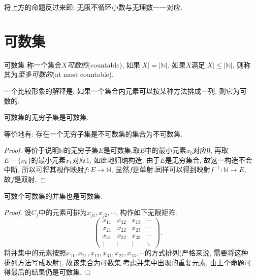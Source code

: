 将上方的命题反过来即: 无限不循环小数与无理数一一对应.

\newpage
\section{可数集}

\begin{definition}{可数集}
	称一个集合$X$\textit{可数的}(countable), 如果$|X| = |\mathbb{N}|$. 如果$X$满足$|X| \leq |\mathbb{N}|$, 则称其为\textit{至多可数的}(at most countable).
\end{definition}

一个比较形象的解释是, 如果一个集合内元素可以按某种方法排成一列, 则它为可数的.

\begin{proposition}{}
	可数集的无穷子集是可数集.
\end{proposition}
\begin{remark}
	等价地有: 存在一个无穷子集是不可数集的集合为不可数集.
\end{remark}
\begin{proof}
	等价于说明$\mathbb{N}$的无穷子集$E$是可数集.取$E$中的最小元素$x_0$对应$0$, 再取$E-\{ x_0 \}$的最小元素$x_1$对应$1$, 如此地归纳构造, 由于$E$是无穷集合, 故这一构造不会中断, 所以可将其视作映射$f: E \to \mathbb{N}$, 显然$f$是单射.同样可以得到映射$f^{-1}: \mathbb{N} \to E$, 故$f$是双射.
\end{proof}

\begin{proposition}{}
	可数个可数集的并集也是可数集.
\end{proposition}
\begin{proof}
	设$C_j$中的元素可排为$x_{j1}, x_{j2}, \cdots $, 构作如下无限矩阵: $$\begin{pmatrix}
 x_{11} & x_{12} & x_{13} & \cdots \\
 x_{21} & x_{22} & x_{23} & \cdots \\
 x_{31} & x_{32} & x_{33} & \cdots \\
 \vdots & \vdots & \vdots & \ddots
\end{pmatrix}.$$
	将并集中的元素按照$x_{11}, x_{21}, x_{12}, x_{31}, x_{22}, x_{13}, \cdots$的方式排列(严格来说, 需要将这种排列方法写成映射), 故该集合为可数集.考虑并集中出现的重复元素, 由上个命题可得最后的结果仍是可数集.
\end{proof}

